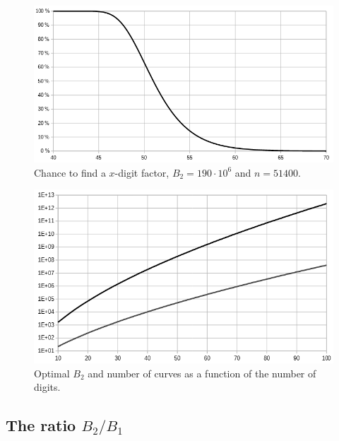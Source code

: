 \documentclass[a4paper, 11pt, pdftex]{report}
\theoremstyle{plain}
\theoremstyle{definition}
\begin{document}
\begin{figure}[!ht]
	\vspace*{1cm}
	\centering
	\includegraphics[width=15.5cm, angle=0]{img/prob_digits.png}
	\caption{\label{fig:p_dgt} Chance to find a $x$-digit factor, $B_2 = 190\cdot 10^6$ and $n = 51400$.}
\end{figure}

\begin{figure}[!ht]
	\vspace*{2cm}
	\centering
	\includegraphics[width=15.5cm, angle=0]{img/B2_n_digits.png}
	\caption{\label{fig:B2_dgt} Optimal $B_2$ and number of curves as a function of the number of digits.}
\end{figure}

\subsection{The ratio $B_2 / B_1$} \label{chap:ratio_B2_B1}
\end{document}
